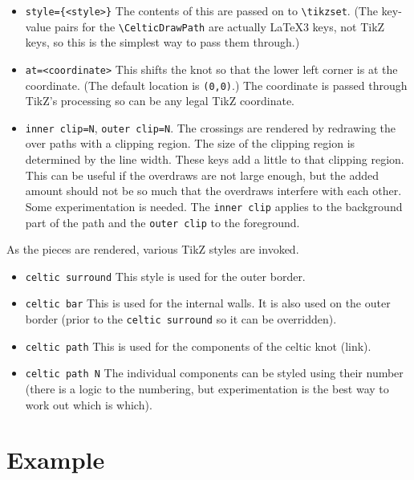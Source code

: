 \documentclass{ltxdoc}
\begin{document}
\begin{itemize}
\item \Verb+style={<style>}+ The contents of this are passed on to \Verb+\tikzset+.
(The key-value pairs for the \Verb+\CelticDrawPath+ are actually \LaTeX3 keys, not TikZ keys, so this is the simplest way to pass them through.)

\item \Verb+at=<coordinate>+ This shifts the knot so that the lower left corner is at the coordinate.
(The default location is \Verb+(0,0)+.)
The coordinate is passed through TikZ's processing so can be any legal TikZ coordinate.

\item \Verb+inner clip=N+, \Verb+outer clip=N+.  The crossings are rendered by redrawing the over paths with a clipping region.
The size of the clipping region is determined by the line width.
These keys add a little to that clipping region.
This can be useful if the overdraws are not large enough, but the added amount should not be so much that the overdraws interfere with each other.
Some experimentation is needed.
The \Verb+inner clip+ applies to the background part of the path and the \Verb+outer clip+ to the foreground.

\end{itemize}

As the pieces are rendered, various TikZ styles are invoked.

\begin{itemize}
\item \Verb+celtic surround+ This style is used for the outer border.

\item \Verb+celtic bar+ This is used for the internal walls.
It is also used on the outer border (prior to the \Verb+celtic surround+ so it can be overridden).

\item \Verb+celtic path+ This is used for the components of the celtic knot (link).

\item \Verb+celtic path N+ The individual components can be styled using their number (there is a logic to the numbering, but experimentation is the best way to work out which is which).


\end{itemize}

\section{Example}
\end{document}
